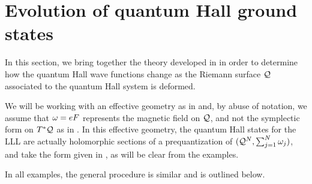 \documentclass[notas.tex]{subfiles}
\begin{document}
\section{Evolution of quantum Hall ground states} \label{sec_geometry_dependence_overview}
In this section, we bring together the theory developed in  in order to determine how the quantum Hall wave functions change as the Riemann surface $\mathcal{Q}$ associated to the quantum Hall system is deformed. 

We will be working with an effective geometry as in  and, by abuse of notation, we assume that $\omega = eF$ represents the magnetic field on $\mathcal{Q}$, and not the symplectic form on $T^*\mathcal{Q}$ as in . In this effective geometry, the quantum Hall states for the LLL are actually holomorphic sections of a prequantization of $(\mathcal{Q}^N, \sum_{j=1}^{N} \omega_j)$, and take the form given in , as will be clear from the examples.

In all examples, the general procedure is similar and is outlined below. 
\end{document}
